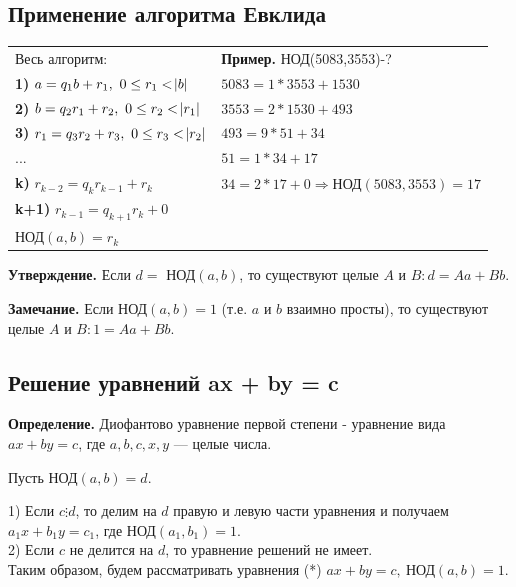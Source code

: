 \documentclass{article}
\begin{document}
        \subsection{Применение алгоритма Евклида}
            \begin{tabular}{ll}
              Весь алгоритм: & \textbf{Пример.} НОД(5083,3553)-?\\
              \textbf{1)} \( a = q_1b + r_1,\ 0 \leq r_1 < \abs{b} \) & \( 5083 = 1*3553 + 1530 \)\\
              \textbf{2)} \( b = q_2r_1 + r_2,\ 0 \leq r_2 < \abs{r_1} \) & \( 3553 = 2*1530 + 493 \)\\
              \textbf{3)} \( r_1 = q_3r_2 + r_3,\ 0 \leq r_3 < \abs{r_2} \) & \( 493 = 9*51 + 34 \)\\
              ...& \( 51 = 1*34 + 17 \)\\
              \textbf{k)} \( r_{k-2} = q_kr_{k-1} + r_k \) & \( 34 = 2*17 + 0 \Rightarrow \textrm{НОД}(5083,3553) = 17\)\\
              \textbf{k+1)} \( r_{k-1} = q_{k+1}r_{k} + 0 \) & \\
              \( \textrm{НОД}(a,b) = r_k \) & \\
            \end{tabular}
			
            \textbf{Утверждение.} Если \( d = \textrm{ НОД}(a,b) \), то существуют целые \( A \) и \( B: d = Aa + Bb \).

    		\textbf{Замечание.} Если \( \textrm{НОД}(a,b) = 1 \) (т.е. \( a \) и \( b \) взаимно просты), то существуют целые \( A \) и \( B: 1 = Aa + Bb \).
        	
        \subsection{Решение уравнений ax + by = c}
        	\textbf{Определение.} Диофантово уравнение первой степени - уравнение вида \( ax + by = c \), где \( a,b,c,x,y \) --- целые числа.

            Пусть \( \textrm{НОД}(a,b) = d \).

            1) Если \( c \vdots d \), то делим на \( d \) правую и левую части уравнения и получаем \( a_1x + b_1y = c_1 \), где \( \textrm{НОД}(a_1, b_1) = 1 \).\\
            2) Если \( c \) не делится на \( d \), то уравнение решений не имеет.\\

            Таким образом, будем рассматривать уравнения (*) \( ax + by = c,\ \textrm{НОД}(a,b) = 1 \).
\end{document}
